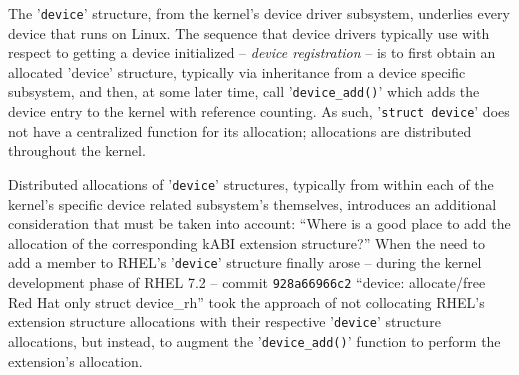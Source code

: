 \documentclass[10pt,oneside,english]{book}
\begin{document}

The '\texttt{device}' structure, from the kernel's device driver subsystem,
underlies every device that runs on Linux. The sequence that device
drivers typically use with respect to getting a device initialized
-- \emph{device registration} -- is to first obtain an allocated
'device' structure, typically via inheritance from a device specific
subsystem, and then, at some later time, call '\texttt{device\_add()}'
which adds the device entry to the kernel with reference counting.
As such, '\texttt{struct device}' does not have a centralized function
for its allocation; allocations are distributed throughout the kernel.

Distributed allocations of '\texttt{device}' structures, typically
from within each of the kernel's specific device related subsystem's
themselves, introduces an additional consideration that must be taken
into account: ``Where is a good place to add the allocation of the
corresponding kABI extension structure?'' When the need to add a
member to RHEL's '\texttt{device}' structure finally arose -- during
the kernel development phase of RHEL 7.2 -- commit \texttt{928a66966c2}
``device: allocate/free Red Hat only struct device\_rh'' took the
approach of not collocating RHEL's extension structure allocations
with their respective '\texttt{device}' structure allocations, but
instead, to augment the '\texttt{device\_add()}' function to perform
the extension's allocation.
\end{document}
